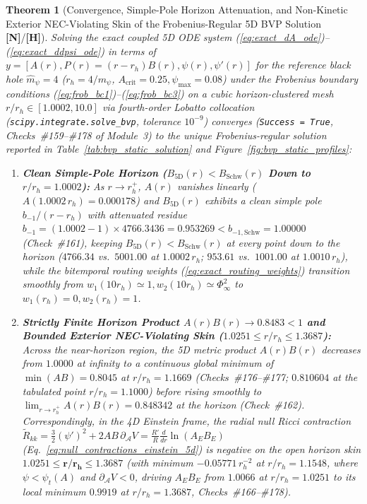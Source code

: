\documentclass[11pt,a4paper]{article}
\newcommand{\catH}{\textbf{\textcolor{orange!85!black}{[H]}}}
\newcommand{\catN}{\textbf{\textcolor{teal!75!black}{[N]}}}
\newtheorem{theorem}{Theorem}[section]
\theoremstyle{definition}
\theoremstyle{remark}
\begin{document}
\begin{theorem}[Convergence, Simple-Pole Horizon Attenuation, and Non-Kinetic Exterior NEC-Violating Skin of the Frobenius-Regular 5D BVP Solution \catN/\catH]
\label{thm:bvp_horizon_solution}
Solving the exact coupled 5D ODE system (\ref{eq:exact_dA_ode})--(\ref{eq:exact_ddpsi_ode}) in terms of $y = [A(r), P(r) = (r - r_h)B(r), \psi(r), \psi'(r)]$ for the reference black hole $\hat{m}_{\psi} = 4$ ($r_h = 4/m_{\psi}$, $A_{\text{crit}} = 0.25, \psi_{\max} = 0.08$) under the Frobenius boundary conditions (\ref{eq:frob_bc1})--(\ref{eq:frob_bc3}) on a cubic horizon-clustered mesh $r/r_h \in [1.0002, 10.0]$ via fourth-order Lobatto collocation (\texttt{scipy.integrate.solve\_bvp}, tolerance $10^{-9}$) converges (\texttt{Success = True}, Checks~\#159--\#178 of Module~3) to the unique Frobenius-regular solution reported in Table~\ref{tab:bvp_static_solution} and Figure~\ref{fig:bvp_static_profiles}:
\begin{enumerate}
  \item[\textnormal{(i)}] \textbf{Clean Simple-Pole Horizon ($B_{\text{5D}}(r) < B_{\text{Schw}}(r)$ Down to $r/r_h = 1.0002$):} As $r \to r_h^+$, $A(r)$ vanishes linearly ($A(1.0002\,r_h) = 0.000178$) and $B_{\text{5D}}(r)$ exhibits a clean simple pole $b_{-1}/(r - r_h)$ with attenuated residue $b_{-1} = (1.0002 - 1)\times 4766.3436 = \mathbf{0.953269} < b_{-1,\text{Schw}} = 1.00000$ (Check~\#161), keeping $B_{\text{5D}}(r) < B_{\text{Schw}}(r)$ at every point down to the horizon ($4766.34$ vs.\ $5001.00$ at $1.0002\,r_h$; $953.61$ vs.\ $1001.00$ at $1.0010\,r_h$), while the bitemporal routing weights (\ref{eq:exact_routing_weights}) transition smoothly from $w_1(10r_h) \simeq 1, w_2(10r_h) \simeq \Phi_{\infty}^2$ to $w_1(r_h) = 0, w_2(r_h) = 1$.
  \item[\textnormal{(ii)}] \textbf{Strictly Finite Horizon Product $A(r)B(r) \to 0.8483 < 1$ and Bounded Exterior NEC-Violating Skin ($1.0251 \le r/r_h \le 1.3687$):} Across the near-horizon region, the 5D metric product $A(r)B(r)$ decreases from $1.0000$ at infinity to a continuous global minimum of $\min(AB) = \mathbf{0.8045}$ at $r/r_h = 1.1669$ (Checks~\#176--\#177; $0.810604$ at the tabulated point $r/r_h = 1.1000$) before rising smoothly to $\lim_{r\to r_h^+}A(r)B(r) = \mathbf{0.848342}$ at the horizon (Check~\#162). Correspondingly, in the 4D Einstein frame, the radial null Ricci contraction $\tilde{R}_{kk} = \frac{3}{2}(\psi')^2 + 2AB\,\partial_{\mathcal{A}}V = \frac{R'}{R}\frac{d}{dr}\ln(A_E B_E)$ (Eq.~\ref{eq:null_contractions_einstein_5d}) is negative on the open horizon skin $\mathbf{1.0251 \le r/r_h \le 1.3687}$ (with minimum $-0.05771\,r_h^{-2}$ at $r/r_h = 1.1548$, where $\psi < \psi_t(A)$ and $\partial_{\mathcal{A}}V < 0$, driving $A_E B_E$ from $1.0066$ at $r/r_h = 1.0251$ to its local minimum $0.9919$ at $r/r_h = 1.3687$, Checks~\#166--\#178).

\end{enumerate}
\end{theorem}
\end{document}
